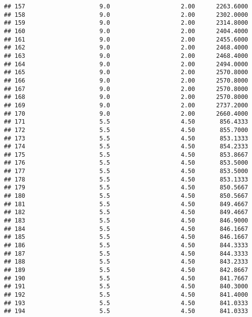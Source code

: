 \documentclass[]{article}
\begin{document}
\begin{verbatim}
## 157                     9.0                    2.00      2263.6000
## 158                     9.0                    2.00      2302.0000
## 159                     9.0                    2.00      2314.8000
## 160                     9.0                    2.00      2404.4000
## 161                     9.0                    2.00      2455.6000
## 162                     9.0                    2.00      2468.4000
## 163                     9.0                    2.00      2468.4000
## 164                     9.0                    2.00      2494.0000
## 165                     9.0                    2.00      2570.8000
## 166                     9.0                    2.00      2570.8000
## 167                     9.0                    2.00      2570.8000
## 168                     9.0                    2.00      2570.8000
## 169                     9.0                    2.00      2737.2000
## 170                     9.0                    2.00      2660.4000
## 171                     5.5                    4.50       856.4333
## 172                     5.5                    4.50       855.7000
## 173                     5.5                    4.50       853.1333
## 174                     5.5                    4.50       854.2333
## 175                     5.5                    4.50       853.8667
## 176                     5.5                    4.50       853.5000
## 177                     5.5                    4.50       853.5000
## 178                     5.5                    4.50       853.1333
## 179                     5.5                    4.50       850.5667
## 180                     5.5                    4.50       850.5667
## 181                     5.5                    4.50       849.4667
## 182                     5.5                    4.50       849.4667
## 183                     5.5                    4.50       846.9000
## 184                     5.5                    4.50       846.1667
## 185                     5.5                    4.50       846.1667
## 186                     5.5                    4.50       844.3333
## 187                     5.5                    4.50       844.3333
## 188                     5.5                    4.50       843.2333
## 189                     5.5                    4.50       842.8667
## 190                     5.5                    4.50       841.7667
## 191                     5.5                    4.50       840.3000
## 192                     5.5                    4.50       841.4000
## 193                     5.5                    4.50       841.0333
## 194                     5.5                    4.50       841.0333

\end{verbatim}
\end{document}
